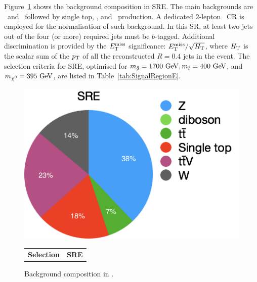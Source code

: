 				Figure~\ref{fig:SRE_bkgcomp} shows the background composition in SRE. The main backgrounds are \Zjets\ and \ttV\ followed by single top, \Wjets, and \ttbar\ production. A dedicated $2$-lepton \Zjets\ \ac{CR} is employed for the normalisation of such background.  In this \ac{SR}, at least two jets out of the four (or more) required jets must be $b$-tagged. Additional discrimination is provided by the $E_{\mathrm{T}}^{\mathrm{miss}}$ significance: $E_{\mathrm{T}}^{\mathrm{miss}}/\sqrt{H_{\mathrm{T}}}$, where $H_{\mathrm{T}}$ is the scalar sum of the $p_{\mathrm{T}}$ of all the reconstructed $R=0.4$ jets in the event. The selection criteria for SRE, optimised for $m_{\gluino} = 1700 \GeV, \mstop=400\GeV$, and $\mLSP=395\GeV$, are listed in Table~\ref{tab:SignalRegionE}.

				\begin{figure}[!htb]
					\centering
					\begin{minipage}[]{.5\textwidth}
						\centering
						\vspace{0pt}
						\includegraphics[width=\textwidth]{figures/stop/piechart_SREcomp}
						\caption{Background composition in \SRE.}
						\label{fig:SRE_bkgcomp}
					\end{minipage}\hfill
					\begin{minipage}[!htb]{.5\textwidth}
						\centering
						\vspace{0pt}
						\def\arraystretch{1.4}
							\begin{tabular}{lc}\toprule
							   {\textbf{Selection}}    & {\textbf{SRE}}\\

\end{tabular}
\end{minipage}
\end{figure}
